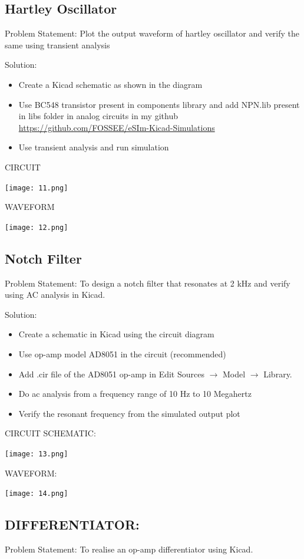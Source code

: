 \documentclass[12pt,a4paper]{  report}
\begin{document}
\subsection{Hartley Oscillator}
Problem Statement:
Plot the output waveform of hartley oscillator and verify the same using transient analysis

Solution:
\begin{itemize}
\item Create a Kicad schematic as shown in the diagram
\item Use BC548 transistor present in components library and add NPN.lib  present in
    libs folder in analog circuits in my github \url{https://github.com/FOSSEE/eSIm-Kicad-Simulations}
\item Use transient analysis and run simulation
\end{itemize}
CIRCUIT
\begin{flushleft}
\texttt{[image: 11.png]}
\end{flushleft}
WAVEFORM
\begin{flushleft}
\texttt{[image: 12.png]}
\end{flushleft}
\subsection{Notch Filter}
Problem Statement:
To design a notch filter that resonates at 2 kHz and verify using AC analysis in Kicad.

Solution:
\begin{itemize}
\item Create a schematic in Kicad using the circuit diagram
\item Use op-amp model AD8051 in the circuit (recommended)
\item Add .cir file of the AD8051 op-amp in Edit Sources $\rightarrow$ Model $\rightarrow$ Library.
\item Do ac analysis from a frequency range of 10 Hz to 10 Megahertz
\item Verify the resonant frequency from the simulated output plot
\end{itemize}
CIRCUIT SCHEMATIC:
\begin{flushleft}
\texttt{[image: 13.png]}
\end{flushleft}
WAVEFORM:
\begin{flushleft}
\texttt{[image: 14.png]}
\end{flushleft}

\subsection{DIFFERENTIATOR:}
Problem Statement:
To realise an op-amp differentiator using Kicad.
\end{document}
